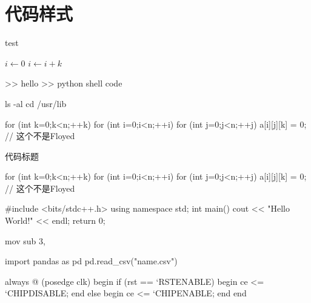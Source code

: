 \chapter{代码样式}
\begin{algorithm}
\caption{test}
\begin{algorithmic}
        \State $i\gets 0$
    \Else
            \State $i\gets i+k$
        \EndIf
    \EndIf
\end{algorithmic}
\end{algorithm}

\begin{shell}
    >> hello
    >> python
    shell code
\end{shell}

\begin{commandshell}
    ls -al
    cd /usr/lib
\end{commandshell}

\begin{latex}
    \setvar{\myname}{\name}
    \newcommand\myaddress{}
    \newcommand{\address}[1]{\renewcommand{\myaddress}{#1}}
\end{latex}

\begin{cdisplay}
    for (int k=0;k<n;++k){
        for (int i=0;i<n;++i){
            for (int j=0;j<n;++j){
                a[i][j][k] = 0;
            }
        }
    }
    // 这个不是Floyed
\end{cdisplay}

\begin{algorithm}
    \caption{代码标题}
    \begin{cpseudo}
        for (int k=0;k<n;++k){
            for (int i=0;i<n;++i){
                for (int j=0;j<n;++j){
                    a[i][j][k] = 0;
                }
            }
        }
        // 这个不是Floyed
    \end{cpseudo}
\end{algorithm}

\begin{cplus}
    #include <bits/stdc++.h>
    using namespace std;
    int main(){
        cout << "Hello World!" << endl;
        return 0;
    }
\end{cplus}

\begin{code}[language=Assembler]
    mov %
    sub 3, %
\end{code}

\begin{python}
    import pandas as pd
    pd.read_csv("name.csv")
\end{python}

\begin{verilog}
    always @ (posedge clk) begin
		if (rst == `RSTENABLE) begin
			ce <= `CHIPDISABLE;
		end else begin
			ce <= `CHIPENABLE;
		end
    end
\end{verilog}